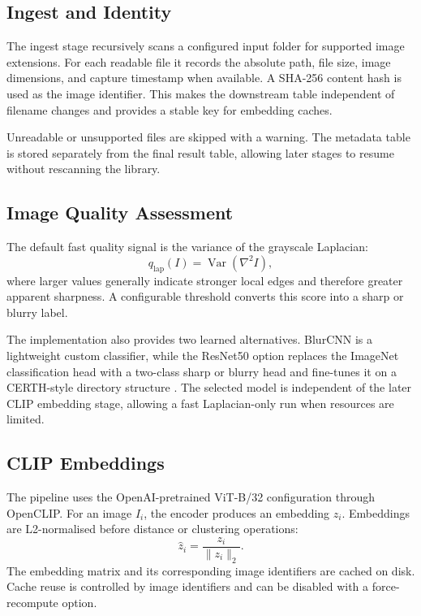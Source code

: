 \documentclass[conference]{IEEEtran}
\begin{document}
\subsection{Ingest and Identity}
The ingest stage recursively scans a configured input folder for supported image extensions. For each readable file it records the absolute path, file size, image dimensions, and capture timestamp when available. A SHA-256 content hash is used as the image identifier. This makes the downstream table independent of filename changes and provides a stable key for embedding caches.

Unreadable or unsupported files are skipped with a warning. The metadata table is stored separately from the final result table, allowing later stages to resume without rescanning the library.

\subsection{Image Quality Assessment}
The default fast quality signal is the variance of the grayscale Laplacian:
\begin{equation}
    q_{\mathrm{lap}}(I) = \operatorname{Var}(\nabla^2 I),
\end{equation}
where larger values generally indicate stronger local edges and therefore greater apparent sharpness. A configurable threshold converts this score into a sharp or blurry label.

The implementation also provides two learned alternatives. BlurCNN is a lightweight custom classifier, while the ResNet50 option replaces the ImageNet classification head with a two-class sharp or blurry head and fine-tunes it on a CERTH-style directory structure \cite{he2016deep}. The selected model is independent of the later CLIP embedding stage, allowing a fast Laplacian-only run when resources are limited.

\subsection{CLIP Embeddings}
The pipeline uses the OpenAI-pretrained ViT-B/32 configuration through OpenCLIP. For an image $I_i$, the encoder produces an embedding $z_i$. Embeddings are L2-normalised before distance or clustering operations:
\begin{equation}
    \hat{z}_i = \frac{z_i}{\lVert z_i \rVert_2}.
\end{equation}
The embedding matrix and its corresponding image identifiers are cached on disk. Cache reuse is controlled by image identifiers and can be disabled with a force-recompute option.
\end{document}
